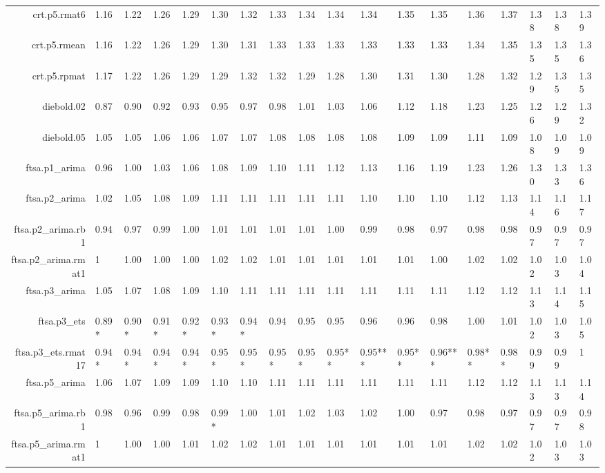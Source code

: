 \begin{table}[ht]
{\begin{tabular}{rlllllllllllllllll}
  crt.p5.rmat6 & 1.16 & 1.22 & 1.26 & 1.29 & 1.30 & 1.32 & 1.33 & 1.34 & 1.34 & 1.34 & 1.35 & 1.35 & 1.36 & 1.37 & 1.38 & 1.38 & 1.39 \\ 
  crt.p5.rmean & 1.16 & 1.22 & 1.26 & 1.29 & 1.30 & 1.31 & 1.33 & 1.33 & 1.33 & 1.33 & 1.33 & 1.33 & 1.34 & 1.35 & 1.35 & 1.35 & 1.36 \\ 
  crt.p5.rpmat & 1.17 & 1.22 & 1.26 & 1.29 & 1.29 & 1.32 & 1.32 & 1.29 & 1.28 & 1.30 & 1.31 & 1.30 & 1.28 & 1.32 & 1.29 & 1.35 & 1.35 \\ 
  diebold.02 & 0.87 & 0.90 & 0.92 & 0.93 & 0.95 & 0.97 & 0.98 & 1.01 & 1.03 & 1.06 & 1.12 & 1.18 & 1.23 & 1.25 & 1.26 & 1.29 & 1.32 \\ 
  diebold.05 & 1.05 & 1.05 & 1.06 & 1.06 & 1.07 & 1.07 & 1.08 & 1.08 & 1.08 & 1.08 & 1.09 & 1.09 & 1.11 & 1.09 & 1.08 & 1.09 & 1.09 \\ 
  ftsa.p1\_arima & 0.96 & 1.00 & 1.03 & 1.06 & 1.08 & 1.09 & 1.10 & 1.11 & 1.12 & 1.13 & 1.16 & 1.19 & 1.23 & 1.26 & 1.30 & 1.33 & 1.36 \\ 
  ftsa.p2\_arima & 1.02 & 1.05 & 1.08 & 1.09 & 1.11 & 1.11 & 1.11 & 1.11 & 1.11 & 1.10 & 1.10 & 1.10 & 1.12 & 1.13 & 1.14 & 1.16 & 1.17 \\ 
  ftsa.p2\_arima.rb1 & 0.94 & 0.97 & 0.99 & 1.00 & 1.01 & 1.01 & 1.01 & 1.01 & 1.00 & 0.99 & 0.98 & 0.97 & 0.98 & 0.98 & 0.97 & 0.97 & 0.97 \\ 
  ftsa.p2\_arima.rmat1 & 1 & 1.00 & 1.00 & 1.00 & 1.02 & 1.02 & 1.01 & 1.01 & 1.01 & 1.01 & 1.01 & 1.00 & 1.02 & 1.02 & 1.02 & 1.03 & 1.04 \\ 
  ftsa.p3\_arima & 1.05 & 1.07 & 1.08 & 1.09 & 1.10 & 1.11 & 1.11 & 1.11 & 1.11 & 1.11 & 1.11 & 1.11 & 1.12 & 1.12 & 1.13 & 1.14 & 1.15 \\ 
  ftsa.p3\_ets & 0.89* & 0.90* & 0.91* & 0.92* & 0.93* & 0.94* & 0.94 & 0.95 & 0.95 & 0.96 & 0.96 & 0.98 & 1.00 & 1.01 & 1.02 & 1.03 & 1.05 \\ 
  ftsa.p3\_ets.rmat17 & 0.94* & 0.94* & 0.94* & 0.94* & 0.95* & 0.95* & 0.95* & 0.95* & 0.95** & 0.95*** & 0.95** & 0.96*** & 0.98** & 0.98* & 0.99 & 0.99 & 1 \\ 
  ftsa.p5\_arima & 1.06 & 1.07 & 1.09 & 1.09 & 1.10 & 1.10 & 1.11 & 1.11 & 1.11 & 1.11 & 1.11 & 1.11 & 1.12 & 1.12 & 1.13 & 1.13 & 1.14 \\ 
  ftsa.p5\_arima.rb1 & 0.98 & 0.96 & 0.99 & 0.98 & 0.99* & 1.00 & 1.01 & 1.02 & 1.03 & 1.02 & 1.00 & 0.97 & 0.98 & 0.97 & 0.97 & 0.97 & 0.98 \\ 
  ftsa.p5\_arima.rmat1 & 1 & 1.00 & 1.00 & 1.01 & 1.02 & 1.02 & 1.01 & 1.01 & 1.01 & 1.01 & 1.01 & 1.01 & 1.02 & 1.02 & 1.02 & 1.03 & 1.03 \\ 

\end{tabular}}
\end{table}
